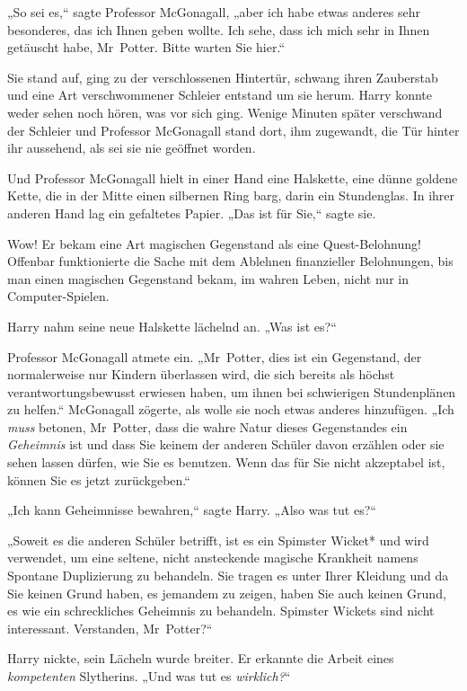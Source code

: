 {„So sei es,“ sagte Professor McGonagall, „aber ich habe etwas anderes sehr besonderes, das ich Ihnen geben wollte. Ich sehe, dass ich mich sehr in Ihnen getäuscht habe, Mr~Potter. Bitte warten Sie hier.“

Sie stand auf, ging zu der verschlossenen Hintertür, schwang ihren Zauberstab und eine Art verschwommener Schleier entstand um sie herum. Harry konnte weder sehen noch hören, was vor sich ging. Wenige Minuten später verschwand der Schleier und Professor McGonagall stand dort, ihm zugewandt, die Tür hinter ihr aussehend, als sei sie nie geöffnet worden.

Und Professor McGonagall hielt in einer Hand eine Halskette, eine dünne goldene Kette, die in der Mitte einen silbernen Ring barg, darin ein Stundenglas. In ihrer anderen Hand lag ein gefaltetes Papier. „Das ist für Sie,“ sagte sie.

Wow! Er bekam eine Art magischen Gegenstand als eine Quest-Belohnung! Offenbar funktionierte die Sache mit dem Ablehnen finanzieller Belohnungen, bis man einen magischen Gegenstand bekam, im wahren Leben, nicht nur in Computer-Spielen.

Harry nahm seine neue Halskette lächelnd an. „Was ist es?“

Professor McGonagall atmete ein. „Mr~Potter, dies ist ein Gegenstand, der normalerweise nur Kindern überlassen wird, die sich bereits als höchst verantwortungsbewusst erwiesen haben, um ihnen bei schwierigen Stundenplänen zu helfen.“ McGonagall zögerte, als wolle sie noch etwas anderes hinzufügen. „Ich \emph{muss} betonen, Mr~Potter, dass die wahre Natur dieses Gegenstandes ein \emph{Geheimnis} ist und dass Sie keinem der anderen Schüler davon erzählen oder sie sehen lassen dürfen, wie Sie es benutzen. Wenn das für Sie nicht akzeptabel ist, können Sie es jetzt zurückgeben.“

„Ich kann Geheimnisse bewahren,“ sagte Harry. „Also was tut es?“

„Soweit es die anderen Schüler betrifft, ist es ein Spimster Wicket* und wird verwendet, um eine seltene, nicht ansteckende magische Krankheit namens Spontane Duplizierung zu behandeln. Sie tragen es unter Ihrer Kleidung und da Sie keinen Grund haben, es jemandem zu zeigen, haben Sie auch keinen Grund, es wie ein schreckliches Geheimnis zu behandeln. Spimster Wickets sind nicht interessant. Verstanden, Mr~Potter?“

Harry nickte, sein Lächeln wurde breiter. Er erkannte die Arbeit eines \emph{kompetenten} Slytherins. „Und was tut es \emph{wirklich?}“

}
